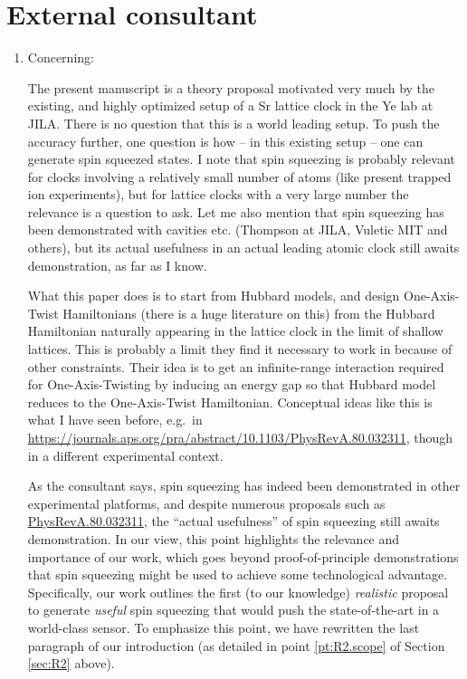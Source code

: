 \documentclass[preprint,superscriptaddress]{revtex4-2}
\newcommand{\blue}[1]{{\color{blue} #1}}
\begin{document}
\section{External consultant}

\begin{enumerate}
\item Concerning:

  \blue{The present manuscript is a theory proposal motivated very
    much by the existing, and highly optimized setup of a Sr lattice
    clock in the Ye lab at JILA. There is no question that this is a
    world leading setup. To push the accuracy further, one question is
    how -- in this existing setup -- one can generate spin squeezed
    states. I note that spin squeezing is probably relevant for clocks
    involving a relatively small number of atoms (like present trapped
    ion experiments), but for lattice clocks with a very large number
    the relevance is a question to ask. Let me also mention that spin
    squeezing has been demonstrated with cavities etc. (Thompson at
    JILA, Vuletic MIT and others), but its actual usefulness in an
    actual leading atomic clock still awaits demonstration, as far as
    I know.}

  \blue{What this paper does is to start from Hubbard models, and
    design One-Axis-Twist Hamiltonians (there is a huge literature on
    this) from the Hubbard Hamiltonian naturally appearing in the
    lattice clock in the limit of shallow lattices. This is probably a
    limit they find it necessary to work in because of other
    constraints. Their idea is to get an infinite-range interaction
    required for One-Axis-Twisting by inducing an energy gap so that
    Hubbard model reduces to the One-Axis-Twist
    Hamiltonian. Conceptual ideas like this is what I have seen
    before, e.g.~in
    \url{https://journals.aps.org/pra/abstract/10.1103/PhysRevA.80.032311},
    though in a different experimental context.}

  As the consultant says, spin squeezing has indeed been demonstrated
  in other experimental platforms, and despite numerous proposals such
  as
  \href{https://journals.aps.org/pra/abstract/10.1103/PhysRevA.80.032311}{PhysRevA.80.032311},
  the ``actual usefulness'' of spin squeezing still awaits
  demonstration.  In our view, this point highlights the relevance and
  importance of our work, which goes beyond proof-of-principle
  demonstrations that spin squeezing might be used to achieve some
  technological advantage.  Specifically, our work outlines the first
  (to our knowledge) {\it realistic} proposal to generate {\it useful}
  spin squeezing that would push the state-of-the-art in a world-class
  sensor.  To emphasize this point, we have rewritten the last
  paragraph of our introduction (as detailed in point
  \ref{pt:R2.scope} of Section \ref{sec:R2} above).


\end{enumerate}
\end{document}
